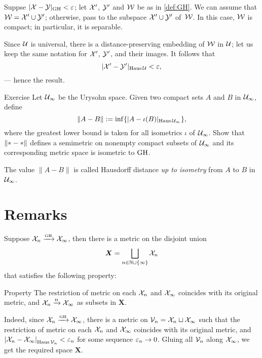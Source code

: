 Suppse $|\mathcal{X}-\mathcal{Y}|_{\operatorname{\rm GH}\nolimits}<\varepsilon$;
let $\mathcal{X}'$, $\mathcal{Y}'$ and $\mathcal{W}$ be as in \ref{def:GH}.
We can assume that $\mathcal{W}=\mathcal{X}'\cup\mathcal{Y}'$;
otherwise, pass to the subspace $\mathcal{X}'\cup\mathcal{Y}'$ of~$\mathcal{W}$.
In this case, $\mathcal{W}$ is compact;
in particular, it is separable.

Since $\mathcal{U}$ is universal, there is a distance-preserving embedding of $\mathcal{W}$ in $\mathcal{U}$;
let us keep the same notation for $\mathcal{X}'$, $\mathcal{Y}'$, and their images.
It follows that 
\[|\mathcal{X}'-\mathcal{Y}'|_{\operatorname{\rm Haus}\nolimits\mathcal{U}}<\varepsilon,\]
--- hence the result.
\qeds

\begin{thm}{Exercise}\label{ex:GH-urysohn}
Let $\mathcal{U}_\infty$ be the Urysohn space.
Given two compact sets $A$ and $B$ in $\mathcal{U}_\infty$, define 
\[\|A-B\|\mathrel{:=}\inf\{|A-\iota(B)|_{\operatorname{\rm Haus}\nolimits\mathcal{U}_\infty}\},\]
where the greatest lower bound is taken for all isometrics $\iota$ of $\mathcal{U}_\infty$.
Show that $\|{*}\z-{*}\|$ defines a semimetric 
on nonempty compact subsets of $\mathcal{U}_\infty$ and its corresponding metric space is isometric to $\operatorname{\rm GH}\nolimits$.
\end{thm}

The value $\|A-B\|$ is called Hausdorff distance \emph{up to isometry} from $A$ to $B$ in $\mathcal{U}_\infty$.

\section{Remarks}\label{sec:remarks-GH}

Suppose $\mathcal{X}_n\xrightarrow{\mbox{\tiny\rm GH}} \mathcal{X}_\infty$, then there is a metric on the disjoint union 
\[\bm{X}=\bigsqcup_{n\in \mathbb{N}\cup\{\infty\}} \mathcal{X}_n\] 
that satisfies the following property:

\begin{thm}{Property}\label{propery:GH}
The restriction of metric on each $\mathcal{X}_n$ and $\mathcal{X}_\infty$ coincides with its original metric, 
and $\mathcal{X}_n\xrightarrow{\mbox{\tiny\rm H}} \mathcal{X}_\infty$ as subsets in $\bm{X}$.
\end{thm}

Indeed, since $\mathcal{X}_n\xrightarrow{\mbox{\tiny\rm GH}} \mathcal{X}_\infty$, there is a metric on $\mathcal{V}_n=\mathcal{X}_n\sqcup \mathcal{X}_\infty$ such that the restriction of metric on each $\mathcal{X}_n$ and $\mathcal{X}_\infty$ coincides with its original metric, and $\dist{\spc{X}_n}{\spc{X}_\infty}{\Haus\spc{V}_n}<\eps_n$ for some sequence $\varepsilon_n\to 0$.
Gluing all $\mathcal{V}_n$ along $\mathcal{X}_\infty$, we get the required space $\bm{X}$.

